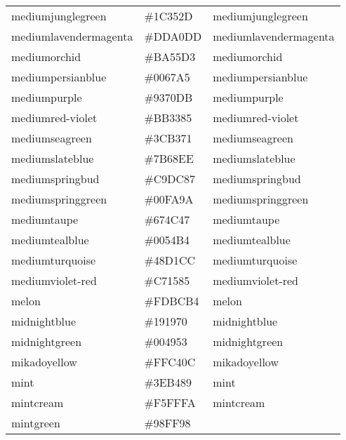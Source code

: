 \documentclass[
]{article}
\begin{document}
\begin{longtable}[]{@{}lll@{}}
mediumjunglegreen & \colorbox[rgb]{0.11,0.21,0.18}{\#1C352D} &
\textcolor[rgb]{0.11,0.21,0.18}{mediumjunglegreen     }\tabularnewline
mediumlavendermagenta & \colorbox[rgb]{0.8,0.6,0.8}{\#DDA0DD} &
\textcolor[rgb]{0.8,0.6,0.8}{mediumlavendermagenta }\tabularnewline
mediumorchid & \colorbox[rgb]{0.73,0.33,0.83}{\#BA55D3} &
\textcolor[rgb]{0.73,0.33,0.83}{mediumorchid          }\tabularnewline
mediumpersianblue & \colorbox[rgb]{0.0,0.4,0.65}{\#0067A5} &
\textcolor[rgb]{0.0,0.4,0.65}{mediumpersianblue     }\tabularnewline
mediumpurple & \colorbox[rgb]{0.58,0.44,0.86}{\#9370DB} &
\textcolor[rgb]{0.58,0.44,0.86}{mediumpurple          }\tabularnewline
mediumred-violet & \colorbox[rgb]{0.73,0.2,0.52}{\#BB3385} &
\textcolor[rgb]{0.73,0.2,0.52}{mediumred-violet      }\tabularnewline
mediumseagreen & \colorbox[rgb]{0.24,0.7,0.44}{\#3CB371} &
\textcolor[rgb]{0.24,0.7,0.44}{mediumseagreen        }\tabularnewline
mediumslateblue & \colorbox[rgb]{0.48,0.41,0.93}{\#7B68EE} &
\textcolor[rgb]{0.48,0.41,0.93}{mediumslateblue       }\tabularnewline
mediumspringbud & \colorbox[rgb]{0.79,0.86,0.54}{\#C9DC87} &
\textcolor[rgb]{0.79,0.86,0.54}{mediumspringbud       }\tabularnewline
mediumspringgreen & \colorbox[rgb]{0.0,0.98,0.6}{\#00FA9A} &
\textcolor[rgb]{0.0,0.98,0.6}{mediumspringgreen     }\tabularnewline
mediumtaupe & \colorbox[rgb]{0.4,0.3,0.28}{\#674C47} &
\textcolor[rgb]{0.4,0.3,0.28}{mediumtaupe           }\tabularnewline
mediumtealblue & \colorbox[rgb]{0.0,0.33,0.71}{\#0054B4} &
\textcolor[rgb]{0.0,0.33,0.71}{mediumtealblue        }\tabularnewline
mediumturquoise & \colorbox[rgb]{0.28,0.82,0.8}{\#48D1CC} &
\textcolor[rgb]{0.28,0.82,0.8}{mediumturquoise       }\tabularnewline
mediumviolet-red & \colorbox[rgb]{0.78,0.08,0.52}{\#C71585} &
\textcolor[rgb]{0.78,0.08,0.52}{mediumviolet-red      }\tabularnewline
melon & \colorbox[rgb]{0.99,0.74,0.71}{\#FDBCB4} &
\textcolor[rgb]{0.99,0.74,0.71}{melon                 }\tabularnewline
midnightblue & \colorbox[rgb]{0.1,0.1,0.44}{\#191970} &
\textcolor[rgb]{0.1,0.1,0.44}{midnightblue          }\tabularnewline
midnightgreen & \colorbox[rgb]{0.0,0.29,0.33}{\#004953} &
\textcolor[rgb]{0.0,0.29,0.33}{midnightgreen         }\tabularnewline
mikadoyellow & \colorbox[rgb]{1.0,0.77,0.05}{\#FFC40C} &
\textcolor[rgb]{1.0,0.77,0.05}{mikadoyellow          }\tabularnewline
mint & \colorbox[rgb]{0.24,0.71,0.54}{\#3EB489} &
\textcolor[rgb]{0.24,0.71,0.54}{mint                  }\tabularnewline
mintcream & \colorbox[rgb]{0.96,1.0,0.98}{\#F5FFFA} &
\textcolor[rgb]{0.96,1.0,0.98}{mintcream             }\tabularnewline
mintgreen & \colorbox[rgb]{0.6,1.0,0.6}{\#98FF98} &

\end{longtable}
\end{document}
